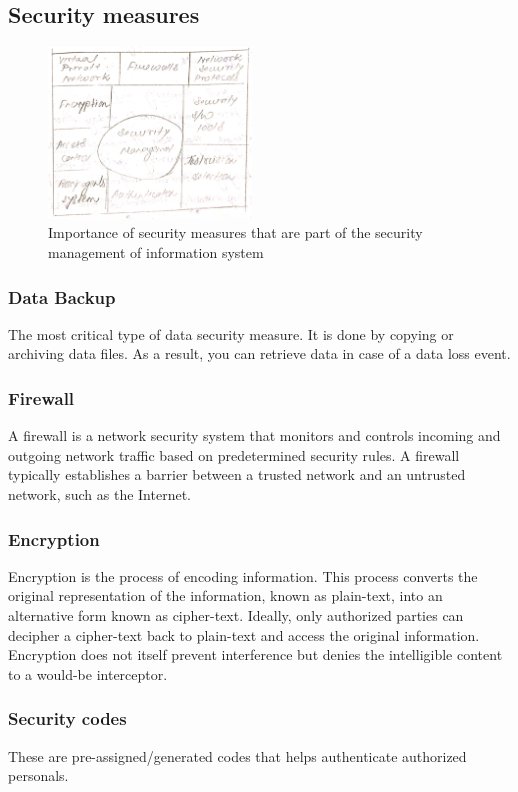 \documentclass[12pt, a4paper]{article}
\begin{document}
\subsection{Security measures}%
\begin{figure}[h]
  \centering
  \includegraphics[width=0.48\textwidth]{secmeasure}
  \caption{Importance of security measures that are part of the
  security management of information system}
\end{figure}
\subsubsection{Data Backup}
The most critical type of data security measure. It is done by copying or
archiving data files. As a result, you can retrieve data in case of a data loss
event.

\subsubsection{Firewall}
A firewall is a network security system that monitors and controls incoming
and outgoing network traffic based on predetermined security rules. A
firewall typically establishes a barrier between a trusted network and an
untrusted network, such as the Internet.

\subsubsection{Encryption}
Encryption is the process of encoding information. This process converts the
original representation of the information, known as plain-text, into an
alternative form known as cipher-text. Ideally, only authorized parties can
decipher a cipher-text back to plain-text and access the original information.
Encryption does not itself prevent interference but denies the intelligible
content to a would-be interceptor.

\subsubsection{Security codes}
These are pre-assigned/generated codes that helps authenticate authorized 
personals.%
\end{document}
